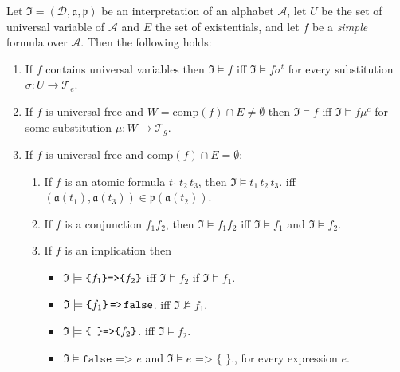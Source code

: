 \begin{definition}
Let $\mathfrak{I}=(\mathcal{D},\mathfrak{a,p})$ be an interpretation of an \nthree alphabet $\mathcal{A}$, let $U$ be the set of universal variable of $\mathcal{A}$ and $E$ the set of existentials,
and let  $f$ be a \emph{simple} formula over $\mathcal{A}$. %
Then the following holds:
\begin{enumerate}
 \item\label{quant1} If $f$ contains universal variables then $\mathfrak{I}\models f$ iff $\mathfrak{I}\models f\sigma^t$ 
 for every substitution $\sigma: U\rightarrow \mathcal{T}_e$. 
 \item \label{quant2} If $f$ is universal-free and $W=\text{comp}(f)\cap E \neq \emptyset$ then $\mathfrak{I}\models f$ 
 iff $\mathfrak{I}\models f\mu^c$ for some substitution $\mu: W\rightarrow \mathcal{T}_g$.
  \item If $f$ is universal free and $\text{comp}(f)\cap E=\emptyset$:
  \begin{enumerate}
   \item If $f$ is an atomic formula $t_1\, t_2\, t_3$, then  $\mathfrak{I} \models t_1\, t_2\, t_3$. 
  iff $(\mathfrak{a}(t_1),\mathfrak{a}(t_3))\in\mathfrak{p}(\mathfrak{a}(t_2))$.
  \item If $f$ is a conjunction $f_1f_2$, then  $\mathfrak{I}\models f_1 f_2$ iff $\mathfrak{I}\models f_1$ and $\mathfrak{I}\models f_2$.\label{conj}
  \item If $f$ is an implication\label{implication} then %
  \begin{itemize}
  \item $\mathfrak{I} \models \verb!{! f_1 \verb!}! \verb!=>! \verb!{! f_2 \verb!}!$ iff $\mathfrak{I} \models f_2$ if $\mathfrak{I} \models f_1$.
  \item \label{fal2} %
  $\mathfrak{I} \models \verb!{! f_1 \verb!}! \,\verb!=>!\, \verb!false!$. iff $\mathfrak{I} \not\models f_1$.
   \item $\mathfrak{I} \models \verb!{ }! \verb!=>! \verb!{! f_2 \verb!}!$. iff $\mathfrak{I} \models f_2$.
   \item $\mathfrak{I} \models \texttt{false => }e$ and $\mathfrak{I}\models e\texttt{ => \{~\}}.$, for every expression $e$.
   \end{itemize}
 \end{enumerate}
\end{enumerate}
  

\end{definition}
